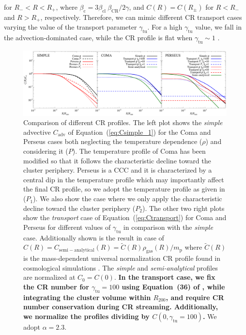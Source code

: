 \documentclass[traditabstract]{aa}
\def\C#1{{\bf #1}}
\newcommand{\rmn}{\mathrm}
\begin{document}
\begin{appendix}
for $R_{-}<R<R_{+}$, where $\beta_{\rmn{c}}=3\beta_{\rmn{cl}}~\beta_{\rmn{CR}}/2\gamma$, 
and $C(R) = C(R_{\pm})$ for $R<R_{-}$ and $R>R_{+}$, respectively. Therefore, we can 
mimic different CR transport cases varying the value of the transport parameter 
$\gamma_{\rmn{tu}}$. For a high $\gamma_{\rmn{tu}}$ value, we fall in the 
advection-dominated case, while the CR profile is flat when $\gamma_{\rmn{tu}} \sim1$ \citep{2011A&A...527A..99E}. 

\begin{figure}[t!]
\centering
\includegraphics[width=0.99\textwidth]{figures/CR_profiles_simple_comparison.eps}
\caption{Comparison of different CR profiles. The left plot shows the \emph{simple} advective $C_{\rmn{adv}}$ of Equation~(\ref{eq:Csimple_1}) for the Coma and Perseus cases both neglecting the temperature dependence ($\rho$) and considering it ($P$). The temperature profile of Coma has been modified so that it follows the characteristic decline toward the cluster periphery. Perseus is a CCC and it is characterized by a central dip in the temperature profile which may importantly affect the final CR profile, so we adopt the temperature profile as given in \cite{2003ApJ...590..225C} ($P_{1}$). We also show the case where we only apply the characteristic decline toward the cluster periphery ($P_{2}$). The other two right plots show the \emph{transport} case of Equation~(\ref{eq:Ctransport}) for Coma and Perseus for different values of $\gamma_{\rmn{tu}}$ in comparison with the \emph{simple} case. Additionally shown is the result in case of $C(R)=C_{\rmn{semi-analytical}}(R)=\tilde{C}(R)\rho_{\rmn{gas}}(R)/m_{\rmn{p}}$ where $\tilde{C}(R)$ is the mass-dependent universal normalization CR profile found in cosmological simulations \citep{2010MNRAS.409..449P}. The \emph{simple} and \emph{semi-analytical} profiles are normalized at $C_{0}=C(0)$. \C{In the transport case, we fix the CR number for $\gamma_{\rmn{tu}}=100$ using Equation~(36) of \cite{2011A&A...527A..99E}, while integrating the cluster volume within $R_{200}$, and require CR number conservation during CR streaming. Additionally, we normalize the profiles
dividing by $C(0,\gamma_{\rmn{tu}}=100)$.} We adopt $\alpha=2.3$.}
\label{fig:simpleVStransport}
\end{figure}


\end{appendix}
\end{document}
